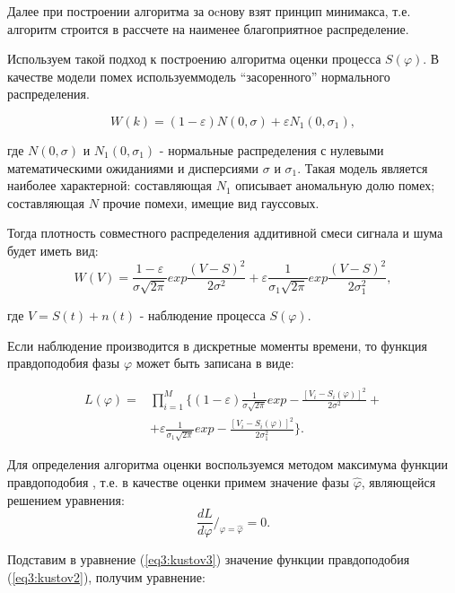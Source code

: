 Далее при построении алгоритма за оcнову взят принцип минимакса, т.е. алгоритм строится в рассчете на наименее благоприятное распределение.

Используем такой подход к построению алгоритма оценки процесса $S(\varphi)$. 
В качестве модели помех используеммодель ``засоренного'' нормального распределения. 

\begin{equation}\label{eq3:kustov}
W(k)=(1-\varepsilon)N(0,\sigma)+\varepsilon N_1(0,\sigma_1),
\end{equation}

\noindent где $N(0,\sigma)$ и $N_1(0,\sigma_1)$ - нормальные распределения с нулевыми математическими ожиданиями и дисперсиями $\sigma$ и $\sigma_1$. 
Такая модель является наиболее характерной: составляющая $N_1$ описывает аномальную долю помех; составляющая $N$ прочие помехи, имещие вид гауссовых.

Тогда плотность совместного распределения аддитивной смеси сигнала и шума будет иметь вид:
\begin{equation}\label{eq3:kustov1}
W(V)=\frac{1-\varepsilon}{\sigma \sqrt{2\pi}}exp\frac{(V-S)^2}{2\sigma^2}+\varepsilon\frac{1}{\sigma_1\sqrt{2\pi}}exp\frac{(V-S)^2}{2\sigma_1^2},
\end{equation}

\noindent где $V=S(t)+n(t)$ - наблюдение процесса $S(\varphi)$.

Если наблюдение производится в дискретные моменты времени, то функция правдоподобия фазы $\varphi$ может быть записана в виде:

\begin{equation}\label{eq3:kustov2}
\begin{split}
L(\varphi)=&\prod_{i=1}^M \{(1-\varepsilon)\frac{1}{\sigma\sqrt{2\pi}}exp-\frac{[V_i-S_i(\varphi)]^2}{2\sigma^2}+\\
&+\varepsilon\frac{1}{\sigma_1\sqrt{2\pi}}exp-\frac{[V_i-S_i(\varphi)]^2}{2\sigma_1^2} \}.
\end{split}
\end{equation}

Для определения алгоритма оценки воспользуемся методом максимума функции правдоподобия \cite{tihonov}, т.е. в качестве оценки примем значение фазы $\hat{\varphi}$, являющейся решением уравнения:
\begin{equation}\label{eq3:kustov3}
\frac{dL}{d\varphi}/_{\varphi=\hat{\varphi}}=0.
\end{equation}

Подставим в уравнение (\ref{eq3:kustov3}) значение функции правдоподобия (\ref{eq3:kustov2}), получим уравнение:

